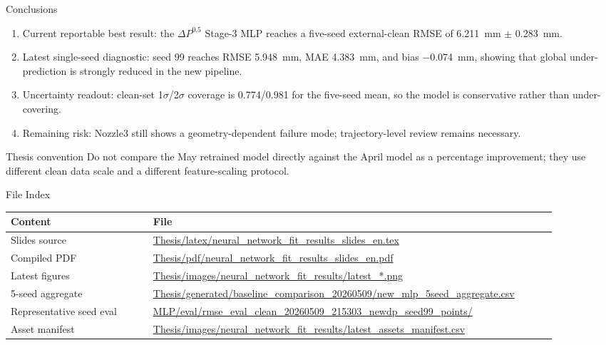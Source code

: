 \documentclass[aspectratio=169,11pt]{beamer}
\newcommand{\goodtext}[1]{\textcolor{green!45!black}{#1}}
\newcommand{\warntext}[1]{\textcolor{red!65!black}{#1}}
\newcommand{\notetext}[1]{\textcolor{blue!65!black}{#1}}
\newcommand{\pathtext}[1]{{\scriptsize\url{#1}}}
\begin{document}
\begin{frame}{Conclusions}
\small
\begin{enumerate}
  \item \goodtext{Current reportable best result}: the \(\Delta P^{0.5}\) Stage-3 MLP reaches a five-seed external-clean RMSE of \SI{6.211}{mm} \(\pm\) \SI{0.283}{mm}.
  \item \goodtext{Latest single-seed diagnostic}: seed 99 reaches RMSE \SI{5.948}{mm}, MAE \SI{4.383}{mm}, and bias \SI{-0.074}{mm}, showing that global under-prediction is strongly reduced in the new pipeline.
  \item \notetext{Uncertainty readout}: clean-set 1\(\sigma\)/2\(\sigma\) coverage is 0.774/0.981 for the five-seed mean, so the model is conservative rather than under-covering.
  \item \warntext{Remaining risk}: Nozzle3 still shows a geometry-dependent failure mode; trajectory-level review remains necessary.
\end{enumerate}

\begin{block}{Thesis convention}
Do not compare the May retrained model directly against the April model as a
percentage improvement; they use different clean data scale and a different
feature-scaling protocol.
\end{block}
\end{frame}

\begin{frame}{File Index}
\small
\begin{tabular}{L{0.24\linewidth}L{0.68\linewidth}}
\toprule
Content & File \\
\midrule
Slides source & \pathtext{Thesis/latex/neural_network_fit_results_slides_en.tex} \\
Compiled PDF & \pathtext{Thesis/pdf/neural_network_fit_results_slides_en.pdf} \\
Latest figures & \pathtext{Thesis/images/neural_network_fit_results/latest_*.png} \\
5-seed aggregate & \pathtext{Thesis/generated/baseline_comparison_20260509/new_mlp_5seed_aggregate.csv} \\
Representative seed eval & \pathtext{MLP/eval/rmse_eval_clean_20260509_215303_newdp_seed99_points/} \\
Asset manifest & \pathtext{Thesis/images/neural_network_fit_results/latest_assets_manifest.csv} \\
\bottomrule
\end{tabular}
\end{frame}
\end{document}
